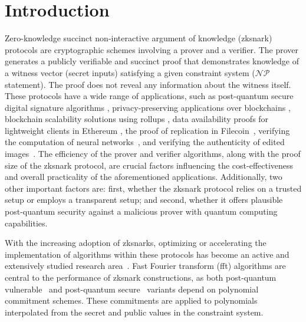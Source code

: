 \chapter{Introduction} \label{ch:Intro}
Zero-knowledge succinct non-interactive argument of knowledge (\gls{zksnark}) protocols are cryptographic schemes involving a prover and a verifier. The prover generates a publicly verifiable and succinct proof that demonstrates knowledge of a witness vector (secret inputs) satisfying a given constraint system ($\mathcal{NP}$ statement). The proof does not reveal any information about the witness itself. These protocols have a wide range of applications, such as post-quantum secure digital signature algorithms \cite{faest2023,picnic2017,Preon2023,picnic2018}, privacy-preserving applications over blockchains \cite{zcash-proc,Hawk,ZeeStar,ZEXE,williamson2018aztec}, blockchain scalability solutions using rollups \cite{Arun2024Jolt,Chaliasos2024,Thibault2022,PolygonZKEVM,zkSync,STARKnet}, data availability proofs for lightweight clients in Ethereum \cite{HallAndersen2024FRIDA}, the proof of replication in Filecoin~\cite{benet2017proof}, verifying the computation of neural networks~\cite{Haochen2024zkLLM,Chen2024ZKML,Weng2021Mystique}, and verifying the authenticity of edited images~\cite{Dziembowski2025VIMz}. 
The efficiency of the prover and verifier algorithms, along with the proof size of the  \gls{zksnark} protocol, are crucial factors influencing the cost-effectiveness and overall practicality of the aforementioned applications. Additionally, two other important factors are: first, whether the \gls{zksnark} protocol relies on a trusted setup or employs a transparent setup; and second, whether it offers plausible post-quantum security against a malicious prover with quantum computing capabilities.

With the increasing adoption of \glspl{zksnark}, optimizing or accelerating the implementation of algorithms within these protocols has become an active and extensively studied research area~\cite{ECFFT1_2023,ECFFT_2022,Diamond2023Towers,CHES:LuoFuGong23,Ji2024GPU,Jandhyala2024AirFRI}. Fast Fourier transform (\gls{fft}) algorithms are central to the performance of \gls{zksnark} constructions, as both post-quantum vulnerable~\cite{Groth2016,Marlin2020,Bulletproofs2018,Gabizon2019PLONK,halo2-book} and post-quantum secure~\cite{Ames2017Ligero,Ben-Sasson2018STARK,Aurora2019,Chiesa2020Fractal,Polaris} variants depend on polynomial commitment schemes. These commitments are applied to polynomials interpolated from the secret and public values in the constraint system.

